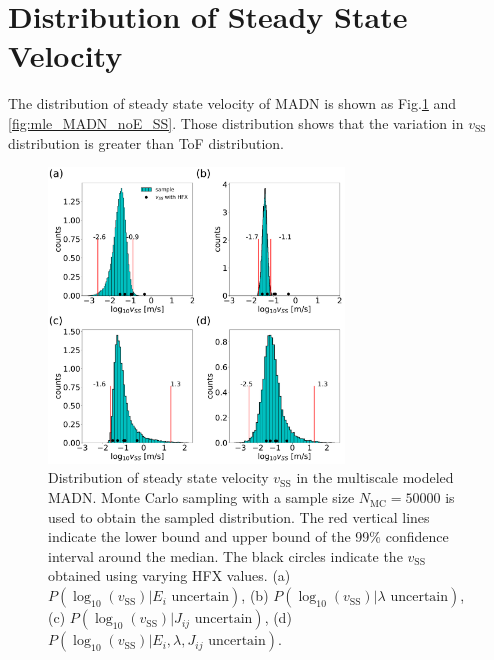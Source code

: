 \documentclass[letterpaper,12pt]{article}
\begin{document}
\section{Distribution of Steady State Velocity}
The distribution of steady state velocity of MADN is shown as Fig.\ref{fig:mle_MADN_withE_SS} and \ref{fig:mle_MADN_noE_SS}. 
Those distribution shows that the variation in $v_\text{SS}$ distribution is greater than ToF distribution. 

\begin{figure}[H]
    \centering
    \includegraphics[width=0.7\textwidth]{figs/fig_mle_MADN_withE_SS.pdf}
    \caption{Distribution of steady state velocity $v_\text{SS}$ in the multiscale modeled MADN.
    Monte Carlo sampling with a sample size $N_\text{MC}=50000$ is used to obtain the sampled distribution.
    The red vertical lines indicate the lower bound and upper bound of the 99\% confidence interval around the median.
    The black circles indicate the $v_\text{SS}$ obtained using varying HFX values.
    (a) $P(\log_{10}(v_\text{SS})|E_i \text{ uncertain})$, 
    (b) $P(\log_{10}(v_\text{SS})|\lambda \text{ uncertain})$, 
    (c) $P(\log_{10}(v_\text{SS})|J_{ij} \text{ uncertain})$, 
    (d) $P(\log_{10}(v_\text{SS})|E_i, \lambda, J_{ij} \text{ uncertain})$. }
    \label{fig:mle_MADN_withE_SS}
\end{figure}
\end{document}
